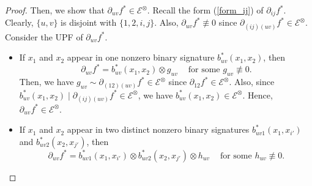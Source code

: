 \begin{proof}
Then, we show that ${\partial}_{uv}{f^{\ast}} \in {\mathcal{E}}^{\otimes}$. 
Recall the form (\ref{form_ij}) of ${\partial}_{ij}{f^{\ast}}$. Clearly, $\{u, v\}$ is disjoint with $\{1, 2, i, j\}$.
Also, ${\partial}_{uv}{f^{\ast}}\not\equiv 0$ since ${\partial}_{(ij)(uv)}{f^{\ast}} \in {\mathcal{E}}^{\otimes}.$
Consider the UPF of ${\partial}_{uv}{f^{\ast}}$.
\begin{itemize}
    \item 
If $x_1$ and $x_2$ appear in one nonzero binary signature ${b^\ast_{uv}}(x_1, x_2)$, then $${\partial}_{uv}{f^{\ast}}={b^\ast_{uv}}(x_1, x_2)\otimes {g_{uv}} ~~~~\text{ for some } {g_{uv}} \not\equiv 0.$$
Then, we have
 ${g_{uv}} \sim
 {\partial}_{(12)(uv)}{f^{\ast}} \in 
{\mathcal{E}}^{\otimes}$ since ${\partial}_{12}{f^{\ast}}\in {\mathcal{E}}^{\otimes}$.
Also, since ${b^\ast_{uv}}(x_1, x_2)\mid {\partial}_{(ij)(uv)}{f^{\ast}}\in {\mathcal{E}}^{\otimes}$, we have ${b^\ast_{uv}}(x_1, x_2)\in {\mathcal{E}}^{\otimes}$. Hence, ${\partial}_{uv}{f^{\ast}}\in {\mathcal{E}}^{\otimes}$.
\item If $x_1$ and $x_2$ appear in two distinct nonzero binary signatures ${b^\ast_{uv1}}(x_1, x_{i'})$ and ${b^\ast_{uv2}}(x_2, x_{j'})$, then
 $${\partial}_{uv}{f^{\ast}}={b^\ast_{uv1}}(x_1, x_{i'})\otimes {b^\ast_{uv2}}(x_2, x_{j'})\otimes{h_{uv}} ~~~~\text{ for some } {h_{uv}}\not\equiv 0.$$
 

\end{itemize}
\end{proof}
